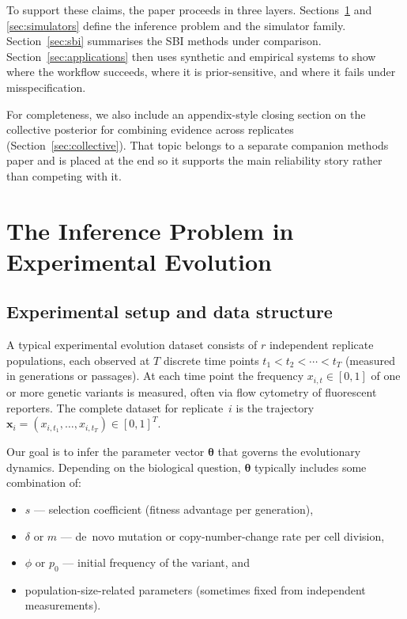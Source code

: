 \documentclass[11pt]{article}
\newcommand{\btheta}{\boldsymbol{\theta}}
\newcommand{\bx}{\mathbf{x}}
\begin{document}
To support these claims, the paper proceeds in three layers.
Sections~\ref{sec:problem} and \ref{sec:simulators} define the inference
problem and the simulator family.
Section~\ref{sec:sbi} summarises the SBI methods under comparison.
Section~\ref{sec:applications} then uses synthetic and empirical systems to
show where the workflow succeeds, where it is prior-sensitive, and where it
fails under misspecification.

For completeness, we also include an appendix-style closing section on the
collective posterior for combining evidence across replicates
(Section~\ref{sec:collective}).
That topic belongs to a separate companion methods paper and is placed at
the end so it supports the main reliability story rather than competing with
it.

\section{The Inference Problem in Experimental Evolution}
\label{sec:problem}

\subsection{Experimental setup and data structure}

A typical experimental evolution dataset consists of $r$ independent
replicate populations, each observed at $T$ discrete time points
$t_1 < t_2 < \cdots < t_T$ (measured in generations or passages).
At each time point the frequency $x_{i,t} \in [0,1]$ of one or more genetic
variants is measured, often via flow cytometry of fluorescent reporters.
The complete dataset for replicate~$i$ is the trajectory
$\bx_i = (x_{i,t_1},\ldots,x_{i,t_T}) \in [0,1]^T$.

Our goal is to infer the parameter vector $\btheta$ that governs the
evolutionary dynamics.
Depending on the biological question, $\btheta$ typically includes some
combination of:
\begin{itemize}
  \item $s$ --- selection coefficient (fitness advantage per generation),
  \item $\delta$ or $m$ --- de~novo mutation or copy-number-change rate per
        cell division,
  \item $\phi$ or $p_0$ --- initial frequency of the variant, and
  \item population-size-related parameters (sometimes fixed from independent
        measurements).
\end{itemize}
\end{document}
